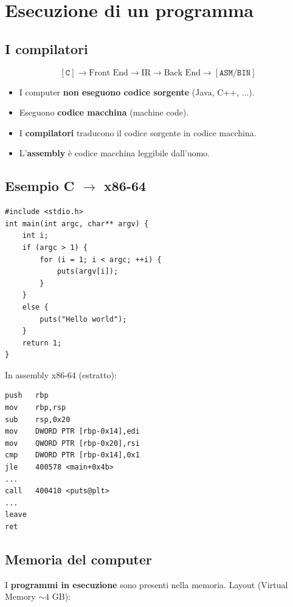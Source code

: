 \section{Esecuzione di un programma}

\subsection{I compilatori}

\[
  [\texttt{C}] \to \boxed{\text{Front End}} \to \boxed{\text{IR}} \to \boxed{\text{Back End}} \to [\texttt{ASM/BIN}]
\]

\begin{itemize}
  \item I computer \textbf{non eseguono codice sorgente} (Java, C++, ...).
  \item Eseguono \textbf{codice macchina} (machine code).
  \item I \textbf{compilatori} traducono il codice sorgente in codice macchina.
  \item L'\textbf{assembly} \`e codice macchina leggibile dall'uomo.
\end{itemize}

\subsection{Esempio C $\to$ x86-64}

\begin{verbatim}
#include <stdio.h>
int main(int argc, char** argv) {
    int i;
    if (argc > 1) {
        for (i = 1; i < argc; ++i) {
            puts(argv[i]);
        }
    }
    else {
        puts("Hello world");
    }
    return 1;
}
\end{verbatim}

In assembly x86-64 (estratto):
\begin{verbatim}
push   rbp
mov    rbp,rsp
sub    rsp,0x20
mov    DWORD PTR [rbp-0x14],edi
mov    QWORD PTR [rbp-0x20],rsi
cmp    DWORD PTR [rbp-0x14],0x1
jle    400578 <main+0x4b>
...
call   400410 <puts@plt>
...
leave
ret
\end{verbatim}

\subsection{Memoria del computer}

I \textbf{programmi in esecuzione} sono presenti nella memoria. Layout (Virtual Memory $\sim 4$ GB):

